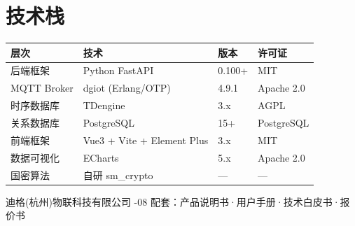 \documentclass[11pt,a4paper]{ctexart}
\begin{document}
\section{技术栈}

\begin{table}[H]\centering
\begin{tabular}{p{3cm} p{3.5cm} p{3.5cm} p{3cm}}
\toprule
\textbf{层次} & \textbf{技术} & \textbf{版本} & \textbf{许可证} \\
\midrule
后端框架 & Python FastAPI & 0.100+ & MIT \\
MQTT Broker & dgiot (Erlang/OTP) & 4.9.1 & Apache 2.0 \\
时序数据库 & TDengine & 3.x & AGPL \\
关系数据库 & PostgreSQL & 15+ & PostgreSQL \\
前端框架 & Vue3 + Vite + Element Plus & 3.x & MIT \\
数据可视化 & ECharts & 5.x & Apache 2.0 \\
国密算法 & 自研 sm\_crypto & — & — \\
\bottomrule
\end{tabular}
\end{table}

\vspace{1em}\noindent\hrulefill
\begin{center}\small
迪格(杭州)物联科技有限公司 -08 \quad 配套：产品说明书·用户手册·技术白皮书·报价书
\end{center}
\end{document}
